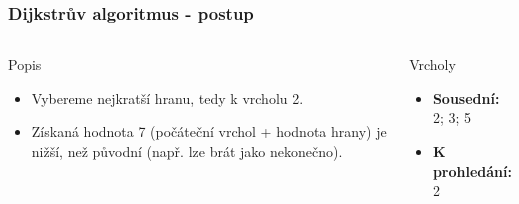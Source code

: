 \documentclass{beamer}
\begin{document}
\begin{frame}
    \frametitle{Dijkstrův algoritmus - postup}
    \begin{columns}
        \begin{block}{Popis}
            \begin{itemize}
                \item Vybereme nejkratší hranu, tedy k vrcholu 2.
                \item Získaná hodnota 7 (počáteční vrchol + hodnota hrany) je nižší, než původní (např. lze brát jako nekonečno).
            \end{itemize}
        \end{block}
        \begin{block}{Vrcholy}
            \begin{itemize}
                \item \textbf{Sousední:} 2; 3; 5 
                \item \textbf{K prohledání:} 2
            \end{itemize}
        \end{block}
    \end{columns}
\end{frame}
\end{document}
